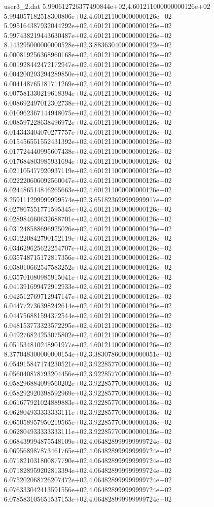 \begin{filecontents}{user3_2.dat}
5.990612726377490844e+02,4.601211000000000126e+02
5.994057182518300806e+02,4.601211000000000126e+02
5.995164387932044292e+02,4.601211000000000126e+02
5.997438219443630487e+02,4.601211000000000126e+02
8.143295000000000528e+02,3.883630400000000122e+02
6.000819256368960168e+02,4.601211000000000126e+02
6.001928442472172947e+02,4.601211000000000126e+02
6.004200293294289850e+02,4.601211000000000126e+02
6.004148765181711269e+02,4.601211000000000126e+02
6.007581330219618394e+02,4.601211000000000126e+02
6.008692497012302738e+02,4.601211000000000126e+02
6.010962367144948075e+02,4.601211000000000126e+02
6.008597228638496972e+02,4.601211000000000126e+02
6.014343404070277757e+02,4.601211000000000126e+02
6.015456551552431392e+02,4.601211000000000126e+02
6.017724440995607438e+02,4.601211000000000126e+02
6.017684803985931694e+02,4.601211000000000126e+02
6.021105477920937119e+02,4.601211000000000126e+02
6.022220606092560047e+02,4.601211000000000126e+02
6.024486514846265663e+02,4.601211000000000126e+02
8.259111299999999574e+02,3.651823699999999917e+02
6.027867551771595345e+02,4.601211000000000126e+02
6.028984660632688701e+02,4.601211000000000126e+02
6.031248588696925026e+02,4.601211000000000126e+02
6.031220842790152119e+02,4.601211000000000126e+02
6.034629625622254707e+02,4.601211000000000126e+02
6.035748715172817356e+02,4.601211000000000126e+02
6.038010662547583252e+02,4.601211000000000126e+02
6.035701080985915041e+02,4.601211000000000126e+02
6.041391699472912933e+02,4.601211000000000126e+02
6.042512769712947147e+02,4.601211000000000126e+02
6.044772736398242614e+02,4.601211000000000126e+02
6.044756881594372544e+02,4.601211000000000126e+02
6.048153773323572295e+02,4.601211000000000126e+02
6.049276824253075802e+02,4.601211000000000126e+02
6.051534810248901977e+02,4.601211000000000126e+02
8.377048300000000154e+02,3.383078600000000051e+02
6.054915847174230521e+02,3.922857700000000136e+02
6.056040878793204456e+02,3.922857700000000136e+02
6.058296884099560202e+02,3.922857700000000136e+02
6.058292920398592969e+02,3.922857700000000136e+02
6.061677921024889883e+02,3.922857700000000136e+02
6.062804933333333111e+02,3.922857700000000136e+02
6.065058957950219565e+02,3.922857700000000136e+02
6.062804933333333111e+02,3.922857700000000136e+02
6.068439994875548109e+02,4.064828999999999724e+02
6.069568987873461765e+02,4.064828999999999724e+02
6.071821031800877790e+02,4.064828999999999724e+02
6.071828959202813394e+02,4.064828999999999724e+02
6.075202068726207472e+02,4.064828999999999724e+02
6.076333042413591556e+02,4.064828999999999724e+02
6.078583105651537153e+02,4.064828999999999724e+02

\end{filecontents}
